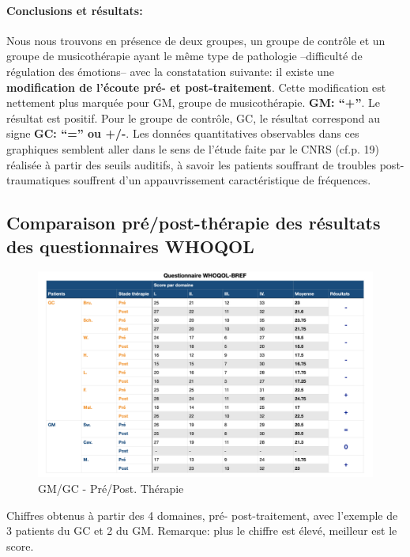 \paragraph{ Conclusions et résultats:}

             Nous nous trouvons
           en présence de deux groupes, un groupe de contrôle et un
           groupe de musicothérapie ayant le même type de
           pathologie --difficulté de régulation des émotions-- avec la constatation suivante: il existe 
          une \textbf{modification de l'écoute pré- et post-traitement}.
          Cette modification est nettement plus marquée
          pour GM, groupe de musicothérapie. \textbf{GM: ``+''}. Le résultat est positif.
Pour le groupe de contrôle, GC, le résultat correspond au signe
\textbf{GC:  ``='' ou +/-}.
 Les données quantitatives observables dans ces graphiques semblent aller dans le
sens de  l'étude faite par le
CNRS (cf.p. 19) réalisée à partir des seuils auditifs, à savoir
les patients souffrant de troubles post-traumatiques souffrent d'un
appauvrissement caractéristique de fréquences.


\subsection{ Comparaison pré/post-thérapie des résultats des
  questionnaires WHOQOL}

\begin{figure}
\centering
\includegraphics[width=1\linewidth]{images/graphiques/questionnaire_wq.png}
\caption[Questionnaire WHOQOL-BREF]{GM/GC - Pré/Post. Thérapie}
       
\label{groupecontroleimage1}
\end{figure}

Chiffres obtenus à partir des 4
domaines, pré- post-traitement, avec l'exemple de 3 patients du GC et 2 du GM.
Remarque: plus le chiffre est élevé, meilleur est le score.
